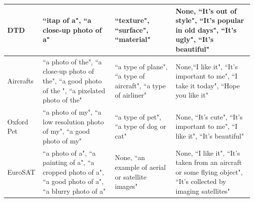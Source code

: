 \begin{table}
{\begin{tabular}{m{1.5cm}|m{4cm}|m{2cm}|m{4cm}}
    	DTD          & ``itap of a", ``a close-up photo of a"                                                                                                                     & ``texture", ``surface", ``material"                              & None, ``It's out of style", ``It's popular in old days", ``It's ugly", ``It's beautiful"                                                               \\ \midrule
    	Aircrafts    & ``a photo of the", ``a close-up photo of the", ``a good photo of the ", ``a pixelated photo of the"                                                                           & ``a type of plane", ``a type of aircraft", ``a type of airliner" & None,``I like it", ``It's important to me", ``I take it today", ``Hope you like it"                                                                    \\ \midrule
    	Oxford Pet   & ``a photo of my", ``a low resolution photo of my", ``a good photo of my"                                                                                           & ``a type of pet", ``a type of dog or cat"                        & None, ``It's cute", ``It's important to me", ``I like it", ``It's beautiful"                                                                           \\ \midrule
    	EuroSAT      & ``a photo  of a", ``a painting of a", ``a cropped photo of a", ``a good photo of a", ``a blurry photo of a"                                                                 & None, ``an example of aerial or satellite images"                 & None, ``I like it", ``It's taken from an aircraft or some flying object", ``It's collected by imaging satellites"                                      \\ \bottomrule
    \end{tabular}
    }
\end{table}



\begin{table}[!t]
\small
    \centering
    \caption{Prompt templates used for zero-shot image-text retrieval on Flickr30K and MSCOCO datasets. 
    }
    \label{tab:prompts_for_retrieval}
\end{table}


